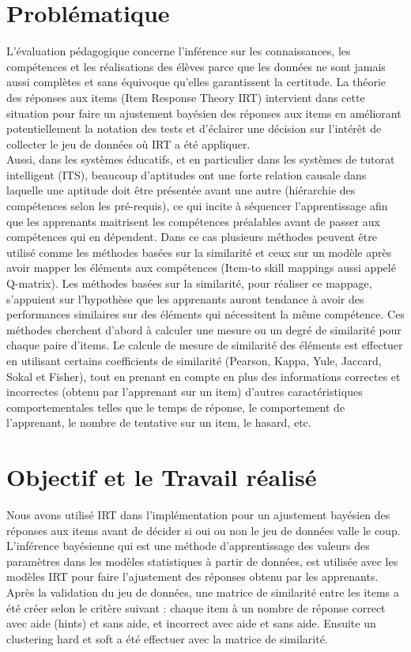 \section*{Problématique}
L'évaluation pédagogique concerne l'inférence sur les connaissances, les compétences et les réalisations des élèves parce que les données ne sont jamais aussi complètes et sans équivoque qu'elles garantissent la certitude. La théorie des réponses aux items (Item Response Theory IRT) intervient dans cette situation pour faire un ajustement bayésien des réponses aux items en améliorant potentiellement la notation des tests et d’éclairer une décision sur l'intérêt de collecter le jeu de données où IRT a été appliquer. \\
Aussi, dans les systèmes éducatifs, et en particulier dans les systèmes de tutorat intelligent (ITS), beaucoup d’aptitudes ont une forte relation causale dans laquelle une aptitude doit être présentée avant une autre (hiérarchie des compétences selon les pré-requis), ce qui incite à séquencer l’apprentissage afin que les apprenants maitrisent les compétences préalables avant de passer aux compétences qui en dépendent. Dans ce cas plusieurs méthodes peuvent être utilisé comme les méthodes basées sur la similarité et ceux sur un modèle après avoir mapper les éléments aux compétences (Item-to skill mappings aussi appelé Q-matrix). Les méthodes basées sur la similarité, pour réaliser ce mappage, s’appuient sur l’hypothèse que les apprenants auront tendance à avoir des performances similaires sur des éléments qui nécessitent la même compétence. Ces méthodes cherchent d’abord à calculer une mesure ou un degré de similarité pour chaque paire d’items. Le calcule de mesure de similarité des éléments est effectuer en utilisant certains coefficients de similarité (Pearson, Kappa, Yule, Jaccard, Sokal et Fisher), tout en prenant en compte en plus des informations correctes et incorrectes (obtenu par l’apprenant sur un item) d’autres caractéristiques comportementales telles que le temps de réponse, le comportement de l’apprenant, le nombre de tentative sur un item, le hasard, etc.

\section*{Objectif et le Travail réalisé }
Nous avons utilisé IRT dans l’implémentation pour un ajustement bayésien des réponses aux items avant de décider si oui ou non le jeu de données valle le coup. L’inférence bayésienne qui est une méthode d’apprentissage des valeurs des paramètres dans les modèles statistiques à partir de données, est utilisée avec les modèles IRT pour faire l’ajustement des réponses obtenu par les apprenants. \\
Après la validation du jeu de données, une matrice de similarité entre les items a été créer selon le critère suivant : chaque item à un nombre de réponse correct avec aide (hints) et sans aide, et incorrect avec aide et sans aide. Ensuite un clustering hard et soft a été effectuer avec la matrice de similarité.

